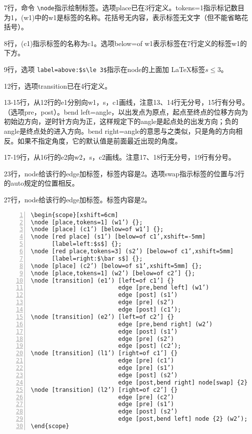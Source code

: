\documentclass[UTF8]{ctexart}
\begin{document}
7行，命令 \verb!\node!指示绘制标签。选项place已在3行定义。tokens=1指示标记数目为1，(w1)中的w1是标签的名称。花括号无内容，表示标签无文字（但不能省略花括号）。

8行，(c1)指示标签的名称为c1。选项below=of w1表示标签在7行定义的标签w1的下方。

9行，选项 \verb!label=above:$s\le 3$!指示在node的上面加 \LaTeX 标签$s\le 3$。

12行，选项transition已在4行定义。

13-15行，从12行的e1分别向w1，s，c1画线，注意13、14行无分号，15行有分号。（选项pre，post）。bend left=angle，以出发点为原点，起点至终点的位移方向为初始边方向，逆时针方向为正，这样规定下的angle是起点处的出发方向；负的angle是终点处的进入方向。bend right=angle的意思与之类似，只是角的方向相反。如果不指定角度，它的默认值是前面最近出现的角度。

17-19行，从16行的e2向w2，s，c2画线。注意17、18行无分号，19行有分号。

23行，node给该行的edge加标签，标签内容是2。选项swap指示标签的位置与2行的auto规定的位置相反。

27行，node给该行的edge加标签。标签内容是2。

\begin{lstlisting}[name=example-2,numbers=left,    numberstyle=\footnotesize]
\begin{scope}[xshift=6cm]
\node [place,tokens=1] (w1’) {};
\node [place] (c1’) [below=of w1’] {};
\node [red place] (s1’) [below=of c1’,xshift=-5mm]
      [label=left:$s$] {};
\node [red place,tokens=3] (s2’) [below=of c1’,xshift=5mm]
      [label=right:$\bar s$] {};
\node [place] (c2’) [below=of s1’,xshift=5mm] {};
\node [place,tokens=1] (w2’) [below=of c2’] {};
\node [transition] (e1’) [left=of c1’] {}
                         edge [pre,bend left] (w1’)
                         edge [post] (s1’)
                         edge [pre] (s2’)
                         edge [post] (c1’);
\node [transition] (e2’) [left=of c2’] {}
                         edge [pre,bend right] (w2’)
                         edge [post] (s1’)
                         edge [pre] (s2’)
                         edge [post] (c2’);
\node [transition] (l1’) [right=of c1’] {}
                         edge [pre] (c1’)
                         edge [pre] (s1’)
                         edge [post] (s2’)
                         edge [post,bend right] node[swap] {2} (w1’);
\node [transition] (l2’) [right=of c2’] {}
                         edge [pre] (c2’)
                         edge [pre] (s1’)
                         edge [post] (s2’)
                         edge [post,bend left] node {2} (w2’);
\end{scope}
\end{lstlisting}
\end{document}
